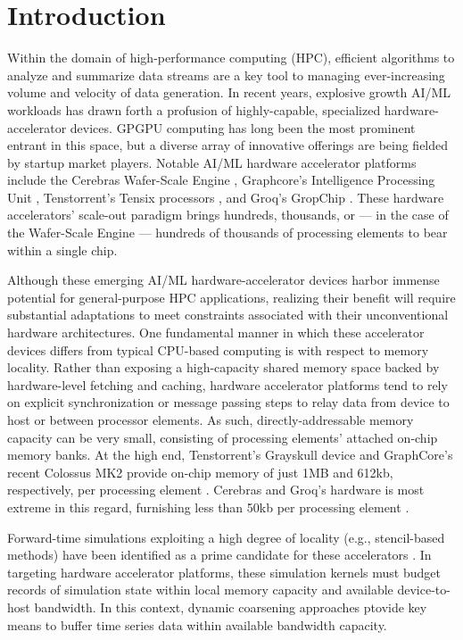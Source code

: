 \section{Introduction} \label{sec:introduction}

Within the domain of high-performance computing (HPC), efficient algorithms to analyze and summarize data streams are a key tool to managing ever-increasing volume and velocity of data generation.
In recent years, explosive growth AI/ML workloads has drawn forth a profusion of highly-capable, specialized hardware-accelerator devices.
GPGPU computing has long been the most prominent entrant in this space, but a diverse array of innovative offerings are being fielded by startup market players.
Notable AI/ML hardware accelerator platforms include the Cerebras Wafer-Scale Engine \citep{lie2023cerebras}, Graphcore's Intelligence Processing Unit \citep{gepner2024performance}, Tenstorrent's Tensix processors \citep{vasiljevic2021compute}, and Groq's GropChip \citep{abts2022groq}.
These hardware accelerators' scale-out paradigm brings hundreds, thousands, or --- in the case of the Wafer-Scale Engine --- hundreds of thousands of processing elements to bear within a single chip.

Although these emerging AI/ML hardware-accelerator devices harbor immense potential for general-purpose HPC applications, realizing their benefit will require substantial adaptations to meet constraints associated with their unconventional hardware architectures.
One fundamental manner in which these accelerator devices differs from typical CPU-based computing is with respect to memory locality.
Rather than exposing a high-capacity shared memory space backed by hardware-level fetching and caching, hardware accelerator platforms tend to rely on explicit synchronization or message passing steps to relay data from device to host or between processor elements.
As such, directly-addressable memory capacity can be very small, consisting of processing elements' attached on-chip memory banks.
At the high end, Tenstorrent's Grayskull device and GraphCore's recent Colossus MK2 provide on-chip memory of just 1MB and 612kb, respectively, per processing element \citep{vasiljevic2021compute,gepner2024performance}.
Cerebras and Groq's hardware is most extreme in this regard, furnishing less than 50kb per processing element \citep{lie2023cerebras,abts2022groq}.

Forward-time simulations exploiting a high degree of locality (e.g., stencil-based methods) have been identified as a prime candidate for these accelerators \citep{jacquelin2022scalable,brown2023exploring,brown2024accelerating,louw2021using}.
In targeting hardware accelerator platforms, these simulation kernels must budget records of simulation state within local memory capacity and available device-to-host bandwidth.
In this context, dynamic coarsening approaches ptovide key means to buffer time series data within available bandwidth capacity.

